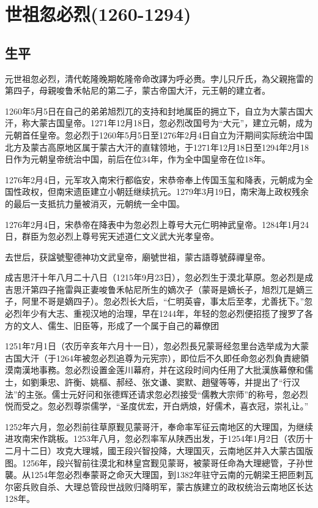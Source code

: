 
\section{世祖忽必烈\tiny(1260-1294)}

\subsection{生平}

元世祖忽必烈，清代乾隆晚期乾隆帝命改譯为呼必赉。孛儿只斤氏，為父親拖雷的第四子，母親唆鲁禾帖尼的第二子，蒙古帝国大汗，元王朝的建立者。

1260年5月5日在自己的弟弟旭烈兀的支持和封地属臣的拥立下，自立为大蒙古国大汗，称大蒙古国皇帝。1271年12月18日，忽必烈改国号为“大元”，建立元朝，成为元朝首任皇帝。忽必烈于1260年5月5日至1276年2月4日自立为汗期间实际统治中国北方及蒙古高原地区属于蒙古大汗的直辖领地，于1271年12月18日至1294年2月18日作为元朝皇帝统治中国，前后在位34年，作为全中国皇帝在位18年。

1276年2月4日，元军攻入南宋行都临安，宋恭帝奉上传国玉玺和降表，元朝成为全国性政权，但南宋遗臣建立小朝廷继续抗元。1279年3月19日，南宋海上政权残余的最后一支抵抗力量被消灭，元朝统一全中国。

1276年2月4日，宋恭帝在降表中为忽必烈上尊号大元仁明神武皇帝。1284年1月24日，群臣为忽必烈上尊号宪天述道仁文义武大光孝皇帝。

去世后，获諡號聖德神功文武皇帝，廟號世祖，蒙古語尊號薛禪皇帝。

成吉思汗十年八月二十八日（1215年9月23日），忽必烈生于漠北草原。忽必烈是成吉思汗第四子拖雷與正妻唆鲁禾帖尼所生的嫡次子（蒙哥是嫡长子，旭烈兀是嫡三子，阿里不哥是嫡四子）。忽必烈长大后，“仁明英睿，事太后至孝，尤善抚下。”忽必烈年少有大志、重视汉地的治理，早在1244年，年轻的忽必烈便招揽了搜罗了各方的文人、儒生、旧臣等，形成了一个属于自己的幕僚团

1251年7月1日（农历辛亥年六月十一日），忽必烈長兄蒙哥经忽里台选举成为大蒙古国大汗（于1264年被忽必烈追尊为元宪宗），即位后不久即任命忽必烈負責總領漠南漢地事務。忽必烈设置金莲川幕府，并在这段时间内任用了大批漢族幕僚和儒士，如劉秉忠、許衡、姚樞、郝经、张文谦、窦默、趙璧等等，并提出了“行汉法”的主张。儒士元好问和张德辉还请求忽必烈接受“儒教大宗师”的称号，忽必烈悦而受之。忽必烈尊崇儒学，“圣度优宏，开白炳烺，好儒术，喜衣冠，崇礼让。”

1252年六月，忽必烈前往草原觐见蒙哥汗，奉命率军征云南地区的大理国，为继续进攻南宋作跳板。1253年八月，忽必烈率军从陕西出发，于1254年1月2日（农历十二月十二日）攻克大理城，國王段兴智投降，大理国灭，云南地区并入大蒙古国版图。1256年，段兴智前往漠北和林皇宫觐见蒙哥，被蒙哥任命為大理總管，子孙世襲。从1254年忽必烈奉蒙哥之命灭大理国，到1382年驻守云南的元朝梁王把匝剌瓦尔密兵败自杀、大理总管段世战败归降明军，蒙古族建立的政权统治云南地区长达128年。

